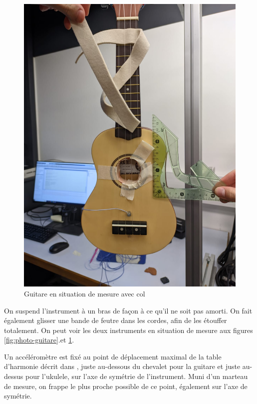 \documentclass[atiam, article]{rapport} %
\begin{document}
\begin{figure}
  \begin{center}
    \includegraphics[width=\textwidth/4]{cordes/ukulele.jpg}
  \end{center}
  \caption{Guitare en situation de mesure avec col}
  \label{fig:photo-ukulele}
\end{figure}

On suspend l'instrument à un bras de façon à ce qu'il ne soit pas amorti. On fait également glisser une bande de feutre dans les cordes, afin de les étouffer totalement. On peut voir les deux instruments en situation de mesure aux figures \ref{fig:photo-guitare}.et \ref{fig:photo-ukulele}.

Un accéléromètre est fixé au point de déplacement maximal de la table d'harmonie décrit dans \cite{fletcher2012physics}, juste au-dessous du chevalet pour la guitare et juste au-dessus pour l'ukulele, sur l'axe de symétrie de l'instrument. Muni d'un marteau de mesure, on frappe le plus proche possible de ce point, également sur l'axe de symétrie.
\end{document}
